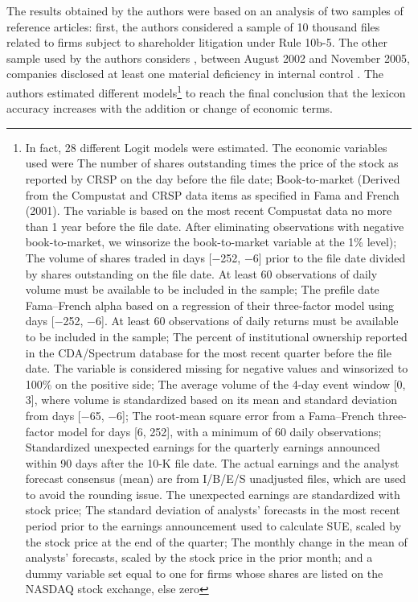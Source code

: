 The results obtained by the authors were based on an analysis of two samples of reference articles: first, the authors considered a sample of 10 thousand files related to firms subject to shareholder litigation under Rule 10b-5. The other sample used by the authors considers \cite{doyle2007accruals}, between August 2002 and November 2005, companies disclosed at least one material deficiency in internal control \citep[p. 41]{loughran2011liability}. The authors estimated different models\footnote{In fact, 28 different Logit models were estimated. The economic variables used were The number of shares outstanding times the price of the stock as reported by CRSP on the day before the file date; Book-to-market (Derived from the Compustat and CRSP data items as specified in Fama and French (2001). The variable is based on the most recent Compustat data no more than 1 year before the file date. After eliminating observations with negative book-to-market, we winsorize the book-to-market variable at the 1\% level); The volume of shares traded in days [−252, −6] prior to the file date divided by shares outstanding on the file date. At least 60 observations of daily volume must be available to be included in the sample; The prefile date Fama–French alpha based on a regression of their three-factor model using days [−252, −6]. At least 60 observations of daily returns must be available to be included in the sample; The percent of institutional ownership reported in the CDA/Spectrum database for the most recent quarter before the file date. The variable is considered missing for negative values and winsorized to 100\% on the positive side; The average volume of the 4-day event window [0, 3], where volume is standardized based on its mean and standard deviation from days [−65, −6]; The root-mean square error from a Fama–French three-factor model for days [6, 252], with a minimum of 60 daily observations; Standardized unexpected earnings for the quarterly earnings announced within 90 days after the 10-K file date. The actual earnings and the analyst forecast consensus (mean) are from I/B/E/S unadjusted files, which are used to avoid the rounding issue. The unexpected earnings are standardized with stock price; The standard deviation of analysts’ forecasts in the most recent period prior to the earnings announcement used to calculate SUE, scaled by the stock price at the end of the quarter; The monthly change in the mean of analysts’ forecasts, scaled by the stock price in the prior month; and a dummy variable set equal to one for firms whose shares are listed on the NASDAQ stock exchange, else zero\citep[p.63]{loughran2011liability}} to reach the final conclusion that the lexicon accuracy increases with the addition or change of economic terms.\\


